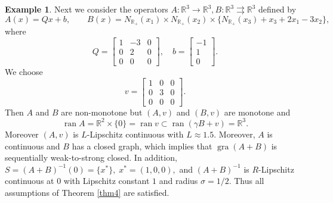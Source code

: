 \documentclass[11pt]{article}
\theoremstyle{definition}
\theoremstyle{definition}
\newtheorem{example}[theorem]{Example}
\theoremstyle{definition}
\newcommand{\R}{\ensuremath{\mathbb R}}
\newcommand{\ran}{\ensuremath{\operatorname{ran}}}
\begin{document}
\begin{example}
Next we consider the operators $A: \R^3\to \R^3, B: \R^3 \rightrightarrows \R^3$ defined by
$$
A(x)=Qx+b, \qquad B(x)= N_{\R_+}(x_1)\times N_{\R_+}(x_2)\times \{N_{\R_+}(x_3)+x_3+2x_1-3x_2\},
$$
where
$$
Q =\begin{bmatrix} 1 & -3 & 0 \\ 0 & 2 & 0 \\ 0 & 0 & 0 \end{bmatrix},  \quad
b = \begin{bmatrix} -1 \\ 1 \\ 0 \end{bmatrix}.
$$
We choose 
$$
v=\begin{bmatrix} 1 & 0 & 0\\ 0 & 3 & 0 \\ 0 & 0 & 0\end{bmatrix}.
$$
Then $A$ and $B$ are non-monotone but  $(A,v)$ and $(B,v)$ are monotone and 
$$
\ran  A = {\R^2\times \{0\}= \ran v}\subset \ran (\gamma B+v)=\R^3.
$$
{Moreover $(A,v)$ is $L$-Lipschitz continuous with $L\approx 1.5$.}  Moreover, $A$ is continuous and $B$ has a closed graph, which implies that $\operatorname{gra}(A+B)$ is sequentially weak-to-strong closed. In addition,
$
S=(A+B)^{-1}(0)=\{x^*\},
\;
x^*=(1,0,0),
$
and {$(A+B)^{-1}$ is $R$-Lipschitz continuous at $0$ with Lipschitz constant $1$ and radius $\sigma=1/2$.}
Thus all assumptions of Theorem \ref{thm4} are satisfied.


\end{example}
\end{document}
